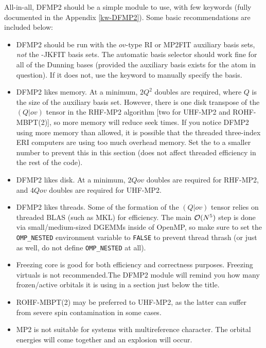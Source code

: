 All-in-all, DFMP2 should be a simple module to use, with few keywords (fully
documented in the Appendix \ref{kw-DFMP2}). Some basic recommendations are included below:
\begin{itemize}
\item DFMP2 should be run with the $ov$-type RI or MP2FIT auxiliary basis sets,
\emph{not} the -JKFIT basis sets. The automatic basis selector should work fine for
all of the Dunning bases (provided the auxiliary basis exists for the atom in
question). If it does not, use the  keyword to manually
specify the basis. 
\item DFMP2 likes memory. At a minimum, $2Q^2$ doubles are required, where $Q$ is
the size of the auxiliary basis set. However, there is one disk transpose of the
$(Q|ov)$ tensor in the RHF-MP2 algorithm [two for UHF-MP2 and ROHF-MBPT(2)], so more
memory will reduce seek times. If you notice DFMP2 using more memory than
allowed, it is possible that the threaded three-index ERI computers are using
too much overhead memory. Set the  to a smaller
number to prevent this in this section (does not affect threaded efficiency in
the rest of the code). 
\item DFMP2 likes disk. At a minimum, $2Qov$ doubles are required for RHF-MP2,
and $4Qov$ doubles are required for UHF-MP2. 
\item DFMP2 likes threads. Some of the formation of the $(Q|ov)$ tensor relies
on threaded BLAS (such as MKL) for efficiency. The main ${\cal O}(N^5)$ step is
done via small/medium-sized DGEMMs inside of OpenMP, so make sure to set the
\texttt{OMP\_NESTED} environment variable to \texttt{FALSE} to prevent thread
thrash (or just as well, do not define \texttt{OMP\_NESTED} at all).
\item Freezing core is good for both efficiency and correctness purposes.
Freezing virtuals is not recommended.The DFMP2 module will remind you how many
frozen/active orbitals it is using in a section just below the title. 
\item ROHF-MBPT(2) may be preferred to UHF-MP2, as the latter can suffer from
severe spin contamination in some cases.
\item MP2 is not suitable for systems with multireference character. The
orbital energies will come together and an explosion will occur. 
\end{itemize}  

